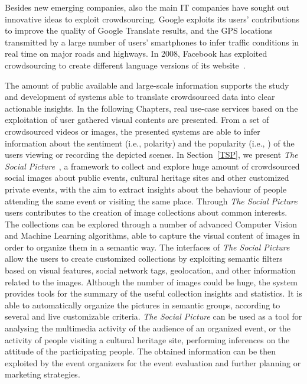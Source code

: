 Besides new emerging companies, also the main IT companies have sought out innovative ideas to exploit crowdsourcing. Google exploits its users' contributions to improve the quality of Google Translate results, and the GPS locations transmitted by a large number of users' smartphones to infer traffic conditions in real time on major roads and highways. 
In 2008, Facebook has exploited crowdsourcing to create different language versions of its website~\cite{dolmaya2011ethics}. %

The amount of public available and large-scale information supports the study and development of systems able to translate crowdsourced data into clear actionable insights.
In the following Chapters, real use-case services based on the exploitation of user gathered visual contents are presented. From a set of crowdsourced videos or images, the presented systems are able to infer information about the sentiment (i.e., polarity) and the popularity (i.e., ) of the users viewing or recording the depicted scenes.
In Section~\ref{TSP}, we present \textit{The Social Picture}~\cite{battiato2016social}, a framework to collect and explore huge amount of crowdsourced social images about public events, cultural heritage sites and other customized private events, with the aim to extract insights about the behaviour of people attending the same event or visiting the same place. 
Through \textit{The Social Picture} users contributes to the creation of image collections about common interests. %
The collections can be explored through a number of advanced Computer Vision and Machine Learning algorithms, able to capture the visual content of images in order to organize them in a semantic way. The interfaces of \textit{The Social Picture} allow the users to create customized collections by exploiting semantic filters based on visual features, social network tags, geolocation, and other information related to the images.
Although the number of images could be huge, the system provides tools for the summary of the useful collection insights and statistics. It is able to automatically organize the pictures in semantic groups, according to several and live customizable criteria.
\textit{The Social Picture} can be used as a tool for analysing the multimedia activity of the audience of an organized event, or the activity of people visiting a cultural heritage site, performing inferences on the attitude of the participating people. The obtained information can be then exploited by the event organizers for the event evaluation and further planning or marketing strategies.


